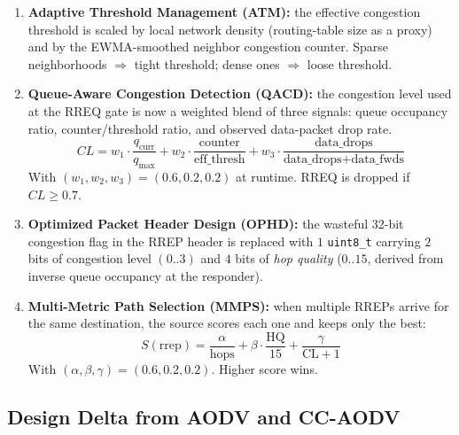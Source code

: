 \documentclass[11pt,a4paper]{article}
\begin{document}
\begin{enumerate}
    \item \textbf{Adaptive Threshold Management (ATM):} the effective congestion
          threshold is scaled by local network density (routing-table size as
          a proxy) and by the EWMA-smoothed neighbor congestion counter.
          Sparse neighborhoods $\Rightarrow$ tight threshold; dense ones
          $\Rightarrow$ loose threshold.
    \item \textbf{Queue-Aware Congestion Detection (QACD):} the congestion
          level used at the RREQ gate is now a weighted blend of three signals:
          queue occupancy ratio, counter/threshold ratio, and observed
          data-packet drop rate.
          \[
          CL = w_1 \cdot \frac{q_{\text{curr}}}{q_{\max}}
             + w_2 \cdot \frac{\text{counter}}{\text{eff\_thresh}}
             + w_3 \cdot \frac{\text{data\_drops}}{\text{data\_drops}+\text{data\_fwds}}
          \]
          With $(w_1,w_2,w_3)=(0.6,0.2,0.2)$ at runtime. RREQ is dropped if
          $CL \geq 0.7$.
    \item \textbf{Optimized Packet Header Design (OPHD):} the wasteful
          32-bit congestion flag in the RREP header is replaced with $1$
          \texttt{uint8\_t} carrying $2$ bits of congestion level
          $(0..3)$ and $4$ bits of \textit{hop quality} ($0..15$, derived from
          inverse queue occupancy at the responder).
    \item \textbf{Multi-Metric Path Selection (MMPS):} when multiple RREPs
          arrive for the same destination, the source scores each one and
          keeps only the best:
          \[
          S(\text{rrep}) = \frac{\alpha}{\text{hops}}
                         + \beta \cdot \frac{\text{HQ}}{15}
                         + \frac{\gamma}{\text{CL}+1}
          \]
          With $(\alpha,\beta,\gamma)=(0.6,0.2,0.2)$. Higher score wins.
\end{enumerate}

\subsection{Design Delta from AODV and CC-AODV}
\end{document}
